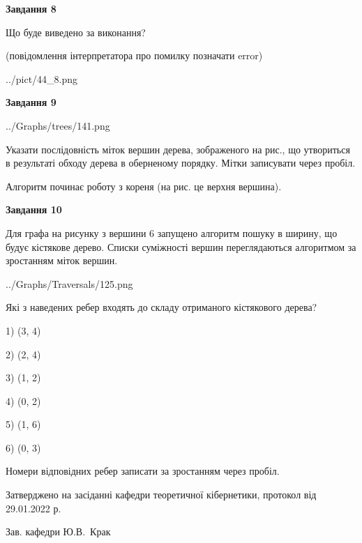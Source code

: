 \documentclass[12pt, ukrainian]{article}
\begin{document}
{\begin {large}
{\begin {center}\textbf{Завдання 8}\end {center}}\par
Що буде виведено за виконання?\par
 (повідомлення інтерпретатора про помилку позначати error)\par
\begin{center}
	{../pict/44_8.png}
\end{center}
\newpage

{\begin {center}\textbf{Завдання 9}\end {center}}\par

\begin{center}
	{../Graphs/trees/141.png}
\end{center}
Указати послідовність міток вершин дерева, зображеного на рис., що утвориться в результаті обходу дерева в оберненому порядку. Мітки записувати через пробіл.\par Алгоритм починає роботу з кореня (на рис. це верхня вершина).\par
\newpage

{\begin {center}\textbf{Завдання 10}\end {center}}\par
Для графа на рисунку з вершини 6 запущено алгоритм пошуку в ширину, що будує кістякове дерево. Списки суміжності вершин переглядаються алгоритмом за зростанням міток вершин.\par
\begin{center}
	{../Graphs/Traversals/125.png}
\end{center}
\par Які з наведених ребер входять до складу отриманого кістякового дерева?\par
1) (3, 4)\par
2) (2, 4)\par
3) (1, 2)\par
4) (0, 2)\par
5) (1, 6)\par
6) (0, 3)\par
{\vskip 15pt} Номери відповідних ребер записати за зростанням через пробіл.\par
\newpage


\end {large}
}
{\smallskip \begin {small} Затверджено на засіданні кафедри теоретичної кібернетики, протокол  від   29.01.2022 р.\par\smallskip\smallskip
{\parbox {6.5 cm}{Зав. кафедри \dotfill Ю.В.~Крак}} \end{small}}
\end{document}

